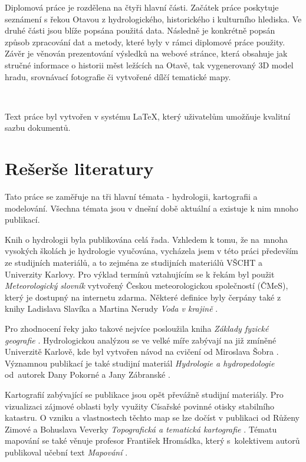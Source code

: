 \documentclass[thesis=M,czech]{FITthesis}[2012/06/26]
\begin{document}
\begin{introduction}
Diplomová práce je rozdělena na čtyři hlavní části. Začátek práce poskytuje seznámení s řekou Otavou z hydrologického, historického i kulturního hlediska. Ve druhé části jsou blíže popsána použitá data. Následně je konkrétně popsán způsob zpracování dat a metody, které byly v rámci diplomové práce použity. Závěr je věnován prezentování výsledků na webové stránce, která obsahuje jak stručné informace o historii měst ležících na Otavě, tak vygenerovaný 3D model hradu, srovnávací fotografie či vytvořené dílčí tematické mapy.

\

Text práce byl vytvořen v systému \LaTeX, který uživatelům umožňuje kvalitní sazbu dokumentů.


\end{introduction}

\chapter{Rešerše literatury}
Tato práce se zaměřuje na tři hlavní témata - hydrologii, kartografii a modelování. Všechna témata jsou v dnešní době aktuální a existuje k nim mnoho publikací.


Knih o hydrologii byla publikována celá řada. Vzhledem k tomu, že na~mnoha vysokých školách je hydrologie vyučována, vycházela jsem v této práci především ze studijních materiálů, a to zejména ze studijních materiálů VŠCHT a Univerzity Karlovy. Pro výklad termínů vztahujícím se k řekám byl použit \textit{Meteorologický slovník} \cite{meteo} vytvořený Českou meteorologickou společností (ČMeS), který je dostupný na internetu zdarma. Některé definice byly čerpány také z knihy Ladislava Slavíka a Martina Nerudy \textit{Voda v krajině} \cite{definiceHydro}. 


Pro zhodnocení řeky jako takové nejvíce posloužila kniha \textit{Základy fyzické geografie} \cite{FGkniha}. Hydrologickou analýzou se ve velké míře zabývají na již zmíněné Univerzitě Karlově, kde byl vytvořen návod na cvičení od Miroslava Šobra \cite{UK}. Významnou publikací je také studijní materiál \textit{Hydrologie a hydropedologie} od~autorek Dany Pokorné a Jany Zábranské \cite{hydrovscht}. 

Kartografií zabývající se publikace jsou opět převážně studijní materiály. Pro vizualizaci zájmové oblasti byly využity Císařské povinné otisky stabilního katastru. O vzniku a vlastnostech těchto map se lze dočíst v publikaci od Růženy Zimové a Bohuslava Veverky \textit{Topografická a tematická kartografie} \cite{topo_skripta}. Tématu mapování se také věnuje profesor František Hromádka, který s~kolektivem autorů publikoval učební text \textit{Mapování} \cite{mapovani_brno}.
\end{document}

